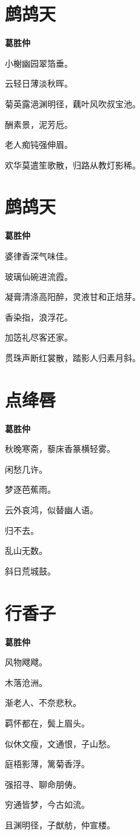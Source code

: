 \documentclass[12pt,a4paper]{ctexbook}
\begin{document}
\section{鹧鸪天}
\textbf{葛胜仲}\par\vspace{0.5em}
小榭幽园翠箔垂。\par
云轻日薄淡秋晖。\par
菊英露浥渊明径，藕叶风吹叔宝池。\par
酬素景，泥芳卮。\par
老人痴钝强伸眉。\par
欢华莫遣笙歌散，归路从教灯影稀。\par

\section{鹧鸪天}
\textbf{葛胜仲}\par\vspace{0.5em}
婆律香深气味佳。\par
玻璃仙碗进流霞。\par
凝膏清涤高阳醉，灵液甘和正焙芽。\par
香染指，浪浮花。\par
加笾礼尽客还家。\par
贯珠声断红裳散，踏影人归素月斜。\par

\section{点绛唇}
\textbf{葛胜仲}\par\vspace{0.5em}
秋晚寒斋，藜床香篆横轻雾。\par
闲愁几许。\par
梦逐芭蕉雨。\par
云外哀鸿，似替幽人语。\par
归不去。\par
乱山无数。\par
斜日荒城鼓。\par

\section{行香子}
\textbf{葛胜仲}\par\vspace{0.5em}
风物飕飕。\par
木落沧洲。\par
渐老人、不奈悲秋。\par
羁怀都在，鬓上眉头。\par
似休文瘦，文通恨，子山愁。\par
庭梧影薄，篱菊香浮。\par
强招寻、聊命朋俦。\par
穷通皆梦，今古如流。\par
且渊明径，子猷舫，仲宣楼。\par
\end{document}
